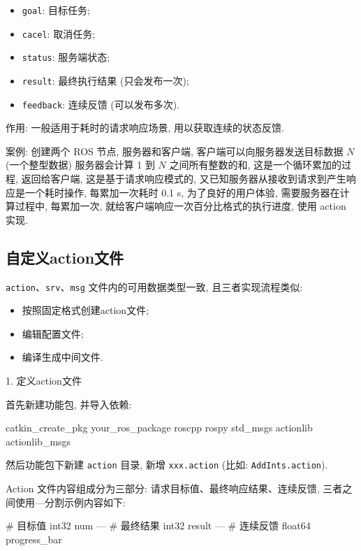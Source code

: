 \documentclass[openany, fontset=windowsold]{ctexbook}
\theoremstyle{kaiti}
\theoremstyle{normal}
\begin{document}
\begin{itemize}
  \item \verb|goal|: 目标任务;
  \item \verb|cacel|: 取消任务;
  \item \verb|status|: 服务端状态;
  \item \verb|result|: 最终执行结果 (只会发布一次);
  \item \verb|feedback|: 连续反馈 (可以发布多次).
\end{itemize}

作用: 一般适用于耗时的请求响应场景, 用以获取连续的状态反馈.

案例: 创建两个 ROS 节点, 服务器和客户端, 客户端可以向服务器发送目标数据 $N$ (一个整型数据) 服务器会计算 1 到 $N$ 之间所有整数的和, 这是一个循环累加的过程, 返回给客户端, 这是基于请求响应模式的, 又已知服务器从接收到请求到产生响应是一个耗时操作, 每累加一次耗时 0.1 s, 为了良好的用户体验, 需要服务器在计算过程中, 每累加一次, 就给客户端响应一次百分比格式的执行进度, 使用 action 实现.

\subsection{自定义action文件}

\verb|action|、\verb|srv|、\verb|msg| 文件内的可用数据类型一致, 且三者实现流程类似:

\begin{itemize}
  \item 按照固定格式创建action文件; 
  \item 编辑配置文件; 
  \item 编译生成中间文件.
\end{itemize}

1. 定义action文件

首先新建功能包, 并导入依赖:

\begin{bash}
  catkin_create_pkg your_ros_package roscpp rospy std_msgs actionlib actionlib_msgs
\end{bash}

然后功能包下新建 \verb|action| 目录, 新增 \verb|xxx.action| (比如: \verb|AddInts.action|).

Action 文件内容组成分为三部分: 请求目标值、最终响应结果、连续反馈, 三者之间使用---分割示例内容如下:

\begin{bash}
  # 目标值
  int32 num
  ---
  # 最终结果
  int32 result
  ---
  # 连续反馈
  float64 progress_bar
\end{bash}
\end{document}
